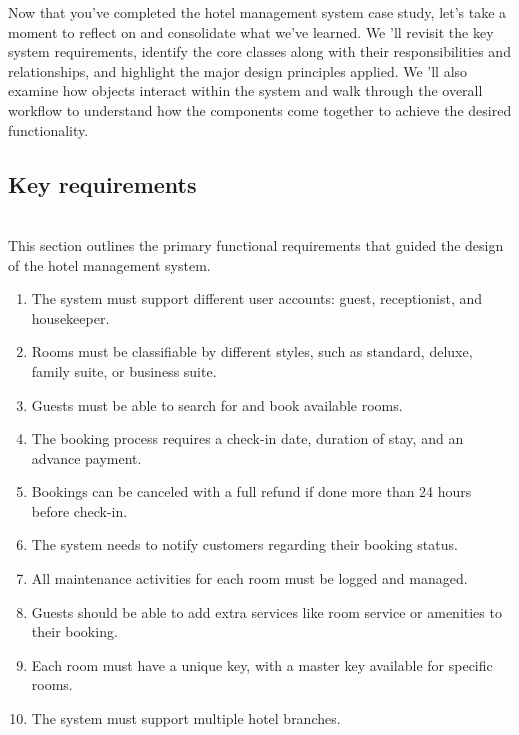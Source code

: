

Now that you've completed the hotel management system case study, let's take a moment to reflect on and consolidate what we've learned. We 'll revisit the key system requirements, identify the core classes along with their responsibilities and relationships, and highlight the major design principles applied. We
'll also examine how objects interact within the system and walk through the overall workflow to understand how the components come together to achieve the desired functionality.

\subsection{Key requirements}\label{vKkq-kSb43w1HBeBI9qeY}
\\
This section outlines the primary functional requirements that guided the design of the hotel management system.

\begin{enumerate}
\item
\protect{}\label{DHmirR6nu7bM_YAKgbqi6}
The system must support different user accounts: guest, receptionist, and housekeeper.
\item
\protect{}\label{6bZ-U2DVSXshSKo-8_zGU}
Rooms must be classifiable by different styles, such as standard, deluxe, family suite, or business suite.
\item
\protect{}\label{5OO52ZVHp2iaqdRJ8Igij}
Guests must be able to search for and book available rooms.
\item
\protect{}\label{KmKLsTYzpWZKBavJXOp6W}
The booking process requires a check-in date, duration of stay, and an advance payment.
\item
\protect{}\label{Lu0mJp7IoWsZAoyOnb5Ac}
Bookings can be canceled with a full refund if done more than 24 hours before check-in.
\item
\protect{}\label{f-fdsu6JpVkRbXjaiack0}
The system needs to notify customers regarding their booking status.
\item
\protect{}\label{PVR0p22U3yDNg7-ZTowvK}
All maintenance activities for each room must be logged and managed.
\item
\protect{}\label{DwrC_7QvdBaJ79km1ZSMh}
Guests should be able to add extra services like room service or amenities to their booking.
\item
\protect{}\label{ipYA3JIwVlBkODfIDTb53}
Each room must have a unique key, with a master key available for specific rooms.
\item
\protect{}\label{UrA-4bfrRZ7ol1JRYmYUB}
The system must support multiple hotel branches.
\end{enumerate}

